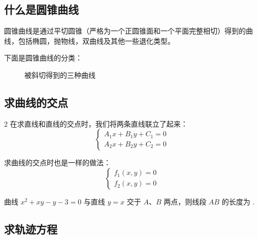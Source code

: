 \subsection{什么是圆锥曲线}

\begin{definition}
    圆锥曲线是通过平切圆锥（严格为一个正圆锥面和一个平面完整相切）得到的曲线，包括椭圆，抛物线，双曲线及其他一些退化类型。
\end{definition}

下面是圆锥曲线的分类：

\begin{figure} [H]
    \centering
    \resizebox{0.45\textwidth}{!}{}
    \caption{被斜切得到的三种曲线}
\end{figure}

\subsection{求曲线的交点}

\begin{theorem}
    \begin{multicols}{2}
        在求直线和直线的交点时，我们将两条直线联立了起来：
        $$
            \begin{cases}
                A_1x + B_1y + C_1 = 0 \\
                A_2x + B_2y + C_2 = 0
            \end{cases}
        $$

        \columnbreak

        求曲线的交点时也是一样的做法：
        $$
            \begin{cases}
                f_1(x,y) = 0 \\
                f_2(x,y) = 0
            \end{cases}
        $$
    \end{multicols}
\end{theorem}

\begin{example}
    曲线 $x^2+x y-y-3=0$ 与直线 $y=x$ 交于 $A $、$B$ 两点，则线段 $A B$ 的长度为 \underline{\qquad}.
\end{example}

\vspace{8em}

\subsection{求轨迹方程}


